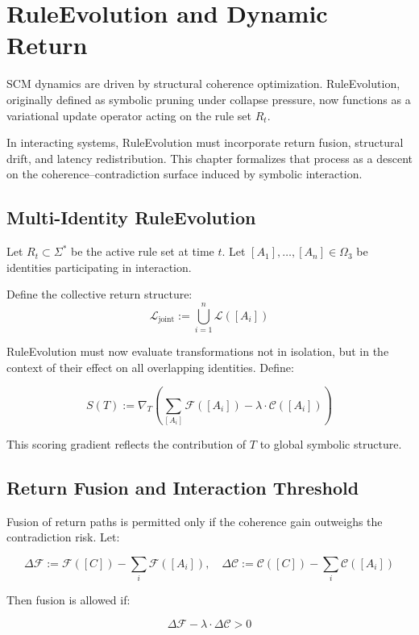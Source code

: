 \chapter{RuleEvolution and Dynamic Return} \label{chapter-ruleevolution-dynamics}

SCM dynamics are driven by structural coherence optimization. RuleEvolution, originally defined as symbolic pruning under collapse pressure, now functions as a variational update operator acting on the rule set $R_t$.

In interacting systems, RuleEvolution must incorporate return fusion, structural drift, and latency redistribution. This chapter formalizes that process as a descent on the coherence–contradiction surface induced by symbolic interaction.

\section{Multi-Identity RuleEvolution} \label{sec:multiidentity-re}

Let $R_t \subset \Sigma^*$ be the active rule set at time $t$. Let $[A_1], \dots, [A_n] \in \Omega_3$ be identities participating in interaction.

Define the collective return structure:
\[
\mathcal{L}_{\text{joint}} := \bigcup_{i=1}^n \mathcal{L}([A_i])
\]

RuleEvolution must now evaluate transformations not in isolation, but in the context of their effect on all overlapping identities. Define:

\[
S(T) := \nabla_T \left( \sum_{[A_i]} \mathcal{F}([A_i]) - \lambda \cdot \mathcal{C}([A_i]) \right)
\]

This scoring gradient reflects the contribution of $T$ to global symbolic structure.

\section{Return Fusion and Interaction Threshold} \label{sec:return-fusion-threshold}

Fusion of return paths is permitted only if the coherence gain outweighs the contradiction risk. Let:

\[
\Delta\mathcal{F} := \mathcal{F}([C]) - \sum_i \mathcal{F}([A_i]),\quad
\Delta\mathcal{C} := \mathcal{C}([C]) - \sum_i \mathcal{C}([A_i])
\]

Then fusion is allowed if:

\[
\Delta\mathcal{F} - \lambda \cdot \Delta\mathcal{C} > 0
\]

